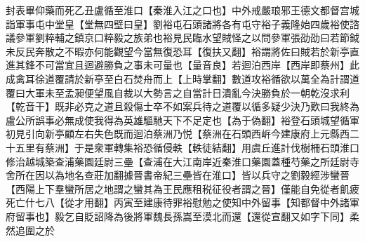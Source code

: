 封表畢仰藥而死乙丑盧循至淮口【秦淮入江之口也】中外戒嚴琅邪王德文都督宫城詣軍事屯中堂皇【堂無四壁曰皇】劉裕屯石頭諸將各有屯守裕子義隆始四歲裕使諮議參軍劉粹輔之鎮京口粹毅之族弟也裕見民臨水望賊怪之以問參軍張劭劭曰若節鉞未反民奔散之不暇亦何能觀望今當無復恐耳【復扶又翻】裕謂將佐曰賊若於新亭直進其鋒不可當宜且迴避勝負之事未可量也【量音良】若迴泊西岸【西岸即蔡州】此成禽耳徐道覆請於新亭至白石焚舟而上【上時掌翻】數道攻裕循欲以萬全為計謂道覆曰大軍未至孟昶便望風自裁以大勢言之自當計日潰亂今決勝負於一朝乾沒求利【乾音干】既非必克之道且殺傷士卒不如案兵待之道覆以循多疑少決乃歎曰我終為盧公所誤事必無成使我得為英雄驅馳天下不足定也【為于偽翻】裕登石頭城望循軍初見引向新亭顧左右失色既而迴泊蔡洲乃悦【蔡洲在石頭西㟁今建康府上元縣西二十五里有蔡洲】于是衆軍轉集裕恐循侵軼【軼徒結翻】用虞丘進計伐樹柵石頭淮口修治越城築查浦藥園廷尉三壘【查浦在大江南岸近秦淮口藥園蓋種芍藥之所廷尉寺舍所在因以為地名查莊加翻據晉書帝紀三壘皆在淮口】皆以兵守之劉毅經涉蠻晉【西陽上下羣蠻所居之地謂之蠻其為王民應租税征役者謂之晉】僅能自免從者飢疲死亡什七八【從才用翻】丙寅至建康待罪裕慰勉之使知中外留事【知都督中外諸軍府留事也】毅乞自貶詔降為後將軍魏長孫嵩至漠北而還【還從宣翻又如字下同】柔然追圍之於

